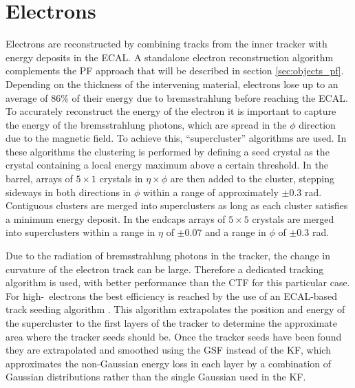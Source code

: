 \section{Electrons}
\label{sec:objects_ele}
Electrons are reconstructed by combining tracks from 
the inner tracker with energy deposits in the \ac{ECAL}.
A standalone electron reconstruction algorithm \cite{cms-elereco-run1} complements the \ac{PF} approach
that will be described in section \ref{sec:objects_pf}. %
Depending on the thickness of the intervening material, electrons lose up to an average of 86\% of their energy 
due to bremsstrahlung before reaching the \ac{ECAL}.
To accurately reconstruct the energy of the electron it is
important to capture the energy of the bremsstrahlung photons, which are spread in the $\phi$ direction
due to the magnetic field. To achieve this, ``supercluster'' algorithms are used.
In these algorithms the clustering
is performed by defining a seed crystal as the crystal containing a local
energy maximum above a certain threshold.
In the barrel, arrays of $5\times 1$ crystals in $\eta \times \phi$ are then added
to the cluster, stepping sideways in both directions in $\phi$ within a range
of approximately $\pm 0.3$ rad. Contiguous clusters are merged into
superclusters as long as each cluster satisfies a minimum energy deposit.
In the endcaps arrays of $5\times 5$ crystals are 
merged into superclusters within a range in $\eta$ of $\pm 0.07$ and a range in $\phi$ of $\pm 0.3$ rad.

Due to the radiation of bremsstrahlung photons in the tracker,
the change in curvature of the electron track can be large. %
Therefore a dedicated tracking algorithm is used, with better performance than the \ac{CTF} for this 
particular case.
For high-\pT~electrons the best efficiency is reached
by the use of an \ac{ECAL}-based track seeding algorithm \cite{cms-elereco-run1}.
This algorithm extrapolates the position and energy of the supercluster to the first
layers of the tracker to determine the approximate area where the tracker seeds should be.
Once the tracker seeds have been found they are extrapolated
and smoothed using the \ac{GSF} \cite{trk-gsf} instead of the \ac{KF}, which 
approximates the non-Gaussian energy loss in each layer by a combination of 
Gaussian distributions rather than the single Gaussian used in the \ac{KF}.

